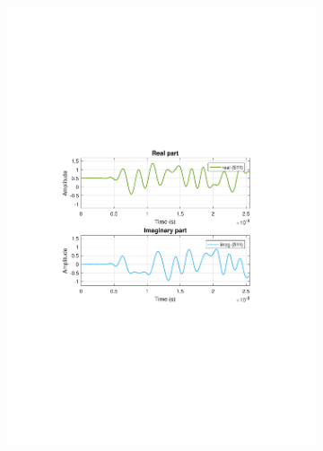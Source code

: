\begin{refsection}
\begin{figure}[h!]
\centering
\begin{subfigure}{.5\textwidth}
  \centering
  \includegraphics[width=\linewidth]{./sdf/dsp_laser_phase_compensation/figures/S11_td.pdf}
  \caption{}
  \label{fig:sub1}
\end{subfigure}%
\begin{subfigure}{.5\textwidth}
  \centering

\end{subfigure}
\end{figure}
\end{refsection}
